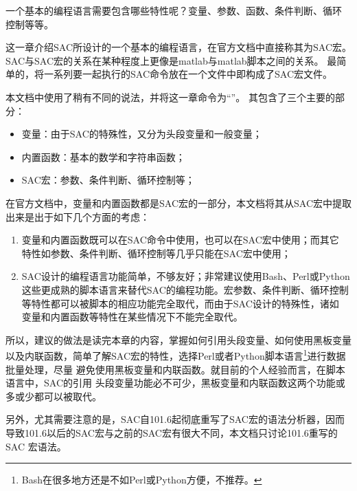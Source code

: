 一个基本的编程语言需要包含哪些特性呢？变量、参数、函数、条件判断、循环
控制等等。

这一章介绍SAC所设计的一个基本的编程语言，在官方文档中直接称其为SAC宏。
SAC与SAC宏的关系在某种程度上更像是matlab与matlab脚本之间的关系。
最简单的，将一系列要一起执行的SAC命令放在一个文件中即构成了SAC宏文件。

本文档中使用了稍有不同的说法，并将这一章命令为``''。
其包含了三个主要的部分：
\begin{itemize}
\item 变量：由于SAC的特殊性，又分为头段变量和一般变量；
\item 内置函数：基本的数学和字符串函数；
\item SAC宏：参数、条件判断、循环控制等；
\end{itemize}

在官方文档中，变量和内置函数都是SAC宏的一部分，本文档将其从SAC宏中提取
出来是出于如下几个方面的考虑：
\begin{enumerate}
\item 变量和内置函数既可以在SAC命令中使用，也可以在SAC宏中使用；而其它
    特性如参数、条件判断、循环控制等几乎只能在SAC宏中使用；
\item SAC设计的编程语言功能简单，不够友好；非常建议使用Bash、Perl或Python
    这些更成熟的脚本语言来替代SAC的编程功能。宏参数、条件判断、循环控制
    等特性都可以被脚本的相应功能完全取代，而由于SAC设计的特殊性，诸如
    变量和内置函数等特性在某些情况下不能完全取代。
\end{enumerate}

所以，建议的做法是读完本章的内容，掌握如何引用头段变量、如何使用黑板变量
以及内联函数，简单了解SAC宏的特性，选择Perl或者Python脚本语言\footnote{
Bash在很多地方还是不如Perl或Python方便，不推荐。}进行数据批量处理，尽量
避免使用黑板变量和内联函数。就目前的个人经验而言，在脚本语言中，SAC的引用
头段变量功能必不可少，黑板变量和内联函数这两个功能或多或少都可以被取代。

另外，尤其需要注意的是，SAC自101.6起彻底重写了SAC宏的语法分析器，因而
导致101.6以后的SAC宏与之前的SAC宏有很大不同，本文档只讨论101.6重写的SAC
宏语法。
